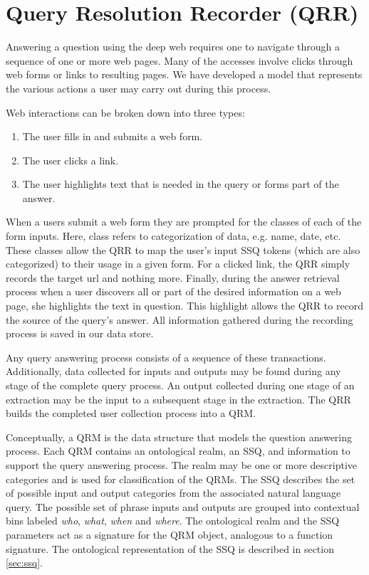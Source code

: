 \section{Query Resolution Recorder (QRR)}
\label{sec:qrr}
Answering a question using the deep web requires one to navigate
through a sequence of one or more web pages. Many of the accesses
involve clicks through web forms or links to resulting pages.  We have
developed a model that represents the various actions a user may carry
out during this process.

Web interactions can be broken down into three types:
\begin{enumerate}
\item The user fills in and submits a web form.
\item The user clicks a link.
\item The user highlights text that is needed in the query or forms
  part of the answer.
\end{enumerate}

When a users submit a web form they are prompted for the classes of
each of the form inputs. Here, class refers to categorization of data,
e.g. name, date, etc. These classes allow the QRR to map the user's
input SSQ tokens (which are also categorized) to their usage in a
given form. For a clicked link, the QRR simply records the target url
and nothing more. Finally, during the answer retrieval process when a
user discovers all or part of the desired information on a web page,
she highlights the text in question. This highlight allows the QRR to
record the source of the query's answer. All information gathered
during the recording process is saved in our data store.

Any query answering process consists of a sequence of these transactions.
Additionally, data collected for inputs and outputs may be found
during any stage of the complete query process.  An output
collected during one stage of an extraction may be the input to a
subsequent stage in the extraction.  The QRR builds the completed user
collection process into a QRM.  

Conceptually, a QRM is the data structure that models the question
answering process.  Each QRM contains an ontological realm, an SSQ,
and information to support the query answering process.  The realm may
be one or more descriptive categories and is used for classification
of the QRMs.  The SSQ describes the set of possible input and output
categories from the associated natural language query.  The possible
set of phrase inputs and outputs are grouped into contextual bins
labeled \emph{who}, \emph{what}, \emph{when} and \emph{where}.  The
ontological realm and the SSQ parameters act as a signature for the
QRM object, analogous to a function signature.  The ontological
representation of the SSQ is described in section \ref{sec:ssq}.

